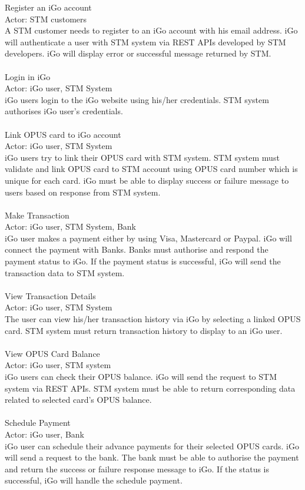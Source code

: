 \documentclass[11pt, english]{article}
\begin{document}
Register an iGo account\\
Actor: STM customers\\
A STM customer needs to register to an iGo account with his email address. iGo will authenticate a user with STM system via REST APIs developed by STM developers. iGo will display error or successful message returned by STM.\\ \\
 Login in iGo\\
Actor: iGo user, STM System \\
iGo users login to the iGo website using his/her credentials. STM system authorises iGo user’s credentials.\\ \\
Link OPUS card to iGo account \\
Actor: iGo user, STM System\\
iGo users try to link their OPUS card with STM system. STM system must validate and link OPUS card to STM account using OPUS card number which is unique for each card. iGo must be able to display success or failure message to users based on response from STM system.\\ \\
 Make Transaction \\
Actor: iGo user, STM System, Bank\\
iGo user makes a payment either by using Visa, Mastercard or Paypal. iGo will connect the payment with Banks. Banks must authorise and respond the payment status to iGo. If the payment status is successful, iGo will send the transaction data to STM system. \\ \\
View Transaction Details \\
Actor: iGo user, STM System\\
The user can view his/her transaction history via iGo by selecting a linked OPUS card. STM system must return transaction history to display to an iGo user. \\ \\
View OPUS Card Balance\\
Actor: iGo user, STM system \\
iGo users can check their OPUS balance. iGo will send the request to STM system via REST APIs. STM system must be able to return corresponding data related to selected card’s OPUS balance.\\ \\
 Schedule Payment\\
Actor: iGo user, Bank\\
iGo user can schedule their advance payments for their selected OPUS cards. iGo will send a request to the bank. The bank must be able to authorise the payment and return the success or failure response message to iGo. If the status is successful, iGo will handle the schedule payment.\\ \\
\end{document}
